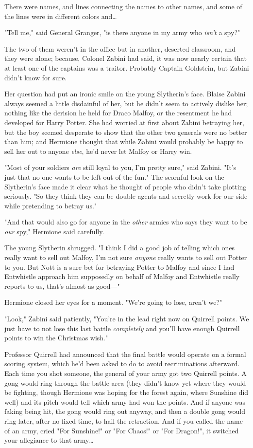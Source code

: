 There were names, and lines connecting the names to other names, and some of
the lines were in different colors and{\ldots}

"Tell me," said General Granger, "is there anyone in my army who \emph{isn't} a
spy?"

The two of them weren't in the office but in another, deserted classroom, and
they were alone; because, Colonel Zabini had said, it was now nearly certain
that at least one of the captains was a traitor. Probably Captain Goldstein,
but Zabini didn't know for sure.

Her question had put an ironic smile on the young Slytherin's face. Blaise
Zabini always seemed a little disdainful of her, but he didn't seem to actively
dislike her; nothing like the derision he held for Draco Malfoy, or the
resentment he had developed for Harry Potter. She had worried at first about
Zabini betraying her, but the boy seemed desperate to show that the other two
generals were no better than him; and Hermione thought that while Zabini would
probably be happy to sell her out to anyone \emph{else}, he'd never let Malfoy
or Harry win.

"Most of your soldiers \emph{are} still loyal to you, I'm pretty sure," said
Zabini. "It's just that no one wants to be left out of the fun." The scornful
look on the Slytherin's face made it clear what he thought of people who didn't
take plotting seriously. "So they think they can be double agents and secretly
work for our side while pretending to betray us."

"And that would also go for anyone in the \emph{other} armies who says they
want to be \emph{our} spy," Hermione said carefully.

The young Slytherin shrugged. "I think I did a good job of telling which ones
really want to sell out Malfoy, I'm not sure \emph{anyone} really wants to sell
out Potter to you. But Nott is a sure bet for betraying Potter to Malfoy and
since I had Entwhistle approach him supposedly on behalf of Malfoy and
Entwhistle really reports to us, that's almost as good---"

Hermione closed her eyes for a moment. "We're going to lose, aren't we?"

"Look," Zabini said patiently, "You're in the lead right now on Quirrell
points. We just have to not lose this last battle \emph{completely} and you'll
have enough Quirrell points to win the Christmas wish."

Professor Quirrell had announced that the final battle would operate on a
formal scoring system, which he'd been asked to do to avoid recriminations
afterward. Each time you shot someone, the general of your army got two
Quirrell points. A gong would ring through the battle area (they didn't know
yet where they would be fighting, though Hermione was hoping for the forest
again, where Sunshine did well) and its pitch would tell which army had won the
points. And if anyone was faking being hit, the gong would ring out anyway, and
then a double gong would ring later, after no fixed time, to hail the
retraction. And if you called the name of an army, cried "For Sunshine!" or
"For Chaos!" or "For Dragon!", it switched your allegiance to that army{\ldots}

